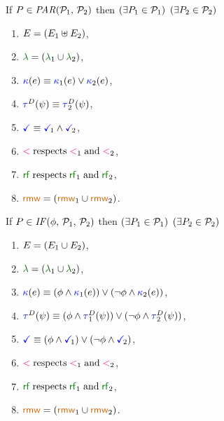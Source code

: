 \begin{scope}
  \noindent
  If $\aPS \in \sPAR{\aPSS_1}{\aPSS_2}$ then  
  $(\exists P_1\in\mathcal{P}_1)$ $(\exists P_2\in\mathcal{P}_2)$
  \begin{multicols}{2}
    \begin{enumerate}[topsep=0pt,label=(\textsc{p}\arabic*),ref=\textsc{p}\arabic*]
    \item \label{par-E}
      $E = (E_1\uplus E_2)$,
    \item \label{par-lambda}
      ${\labeling}=\PBR{{\labeling_1}\cup {\labeling_2}}$, 
    \item \label{par-kappa}
      ${\color{blue}\kappa}(e) \mathrel{\equiv} {\color{blue}\kappa}_1(e)\lor {\color{blue}\kappa}_2(e)$,
    \item \label{par-tau}
      $\aTr{\bEvs}{\bForm} \riff \aTr[2]{\bEvs}{\bForm}$,
    \item \label{par-term}
      $\aTerm \riff \aTerm[1]\land\aTerm[2]$,
    \item \label{par-le}
      ${\lt}\rextends{\lt_1}{\lt_2}$,
    \item \label{par-rf}
      ${\rrfx}\rextends{\rrfx_1}{\rrfx_2}$,
      \setcounter{enumi}{\value{Brmw}}
    \item \label{par-rmw}
      ${\rrmw}=\PBR{{\rrmw_1}\cup{\rrmw_2}}$.
    \end{enumerate}
  \end{multicols}
  \medskip

  \noindent
  If $\aPS \in \sIF{\aForm}\sTHEN\aPSS_1\sELSE\aPSS_2\sFI$ then
  $(\exists P_1\in\mathcal{P}_1)$ $(\exists P_2\in\mathcal{P}_2)$
  \begin{multicols}{2}
    \begin{enumerate}[topsep=0pt,label=(\textsc{i}\arabic*),ref=\textsc{i}\arabic*]
    \item \label{if-E}
      $E = (E_1\cup E_2)$,
    \item \label{if-lambda}
      ${\labeling}=\PBR{{\labeling_1}\cup {\labeling_2}}$, 
    \item \label{if-kappa}
      ${\color{blue}\kappa}(e) \mathrel{\equiv} (\phi\land{\color{blue}\kappa}_1(e))\lor(\neg\phi\land{\color{blue}\kappa}_2(e))$,
    \item \label{if-tau}
      $\aTr{\bEvs}{\bForm} \riff (\aForm\land\aTr[1]{\bEvs}{\bForm})\lor(\neg\aForm\land\aTr[2]{\bEvs}{\bForm})$,
    \item \label{if-term}
      $\aTerm \riff (\aForm\land\aTerm[1])\lor(\neg\aForm\land\aTerm[2])$,
    \item \label{if-le}
      ${\lt}\rextends{\lt_1}{\lt_2}$,
    \item \label{if-rf}
      ${\rrfx}\rextends{\rrfx_1}{\rrfx_2}$,
      \setcounter{enumi}{\value{Brmw}}
    \item \label{par-rmw}
      ${\rrmw}=\PBR{{\rrmw_1}\cup{\rrmw_2}}$.
    \end{enumerate}
  \end{multicols}
  \medskip


\end{scope}
